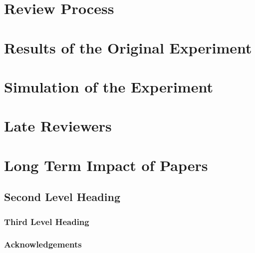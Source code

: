 \documentclass[twoside]{article}
\begin{document}
\section{Review Process}

\section{Results of the Original Experiment}

\section{Simulation of the Experiment}

\section{Late Reviewers}

\section{Long Term Impact of Papers}
\subsection{Second Level Heading}


\subsubsection{Third Level Heading}


\subsubsection*{Acknowledgements}



\end{document}
